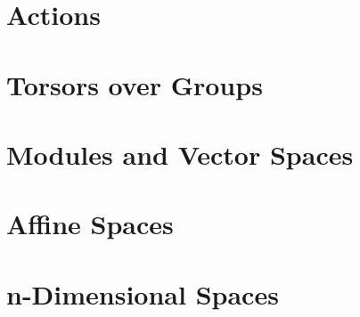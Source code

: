 \documentclass{book}
\begin{document}
\hypertarget{book__pandoc__debug__src__dmt1__lectures__l09_algebra__c02_groupactions.lean.md}{}
\hypertarget{book__pandoc__debug__src__dmt1__lectures__l09_algebra__c02_groupactions.lean.md__actions}{%
\section{Actions}\label{book__pandoc__debug__src__dmt1__lectures__l09_algebra__c02_groupactions.lean.md__actions}}

\hypertarget{book__pandoc__debug__src__dmt1__lectures__l09_algebra__c03_torsors.lean.md}{}
\hypertarget{book__pandoc__debug__src__dmt1__lectures__l09_algebra__c03_torsors.lean.md__torsors-over-groups}{%
\section{Torsors over Groups}\label{book__pandoc__debug__src__dmt1__lectures__l09_algebra__c03_torsors.lean.md__torsors-over-groups}}

\hypertarget{book__pandoc__debug__src__dmt1__lectures__l09_algebra__c04_vectorspaces.lean.md}{}
\hypertarget{book__pandoc__debug__src__dmt1__lectures__l09_algebra__c04_vectorspaces.lean.md__modules-and-vector-spaces}{%
\section{Modules and Vector Spaces}\label{book__pandoc__debug__src__dmt1__lectures__l09_algebra__c04_vectorspaces.lean.md__modules-and-vector-spaces}}

\hypertarget{book__pandoc__debug__src__dmt1__lectures__l09_algebra__c05_affinespaces.lean.md}{}
\hypertarget{book__pandoc__debug__src__dmt1__lectures__l09_algebra__c05_affinespaces.lean.md__affine-spaces}{%
\section{Affine Spaces}\label{book__pandoc__debug__src__dmt1__lectures__l09_algebra__c05_affinespaces.lean.md__affine-spaces}}

\hypertarget{book__pandoc__debug__src__dmt1__lectures__l09_algebra__c06_finitedimensional.lean.md}{}
\hypertarget{book__pandoc__debug__src__dmt1__lectures__l09_algebra__c06_finitedimensional.lean.md__n-dimensional-spaces}{%
\section{n-Dimensional Spaces}\label{book__pandoc__debug__src__dmt1__lectures__l09_algebra__c06_finitedimensional.lean.md__n-dimensional-spaces}}
\end{document}
